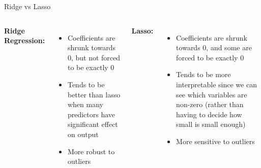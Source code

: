 \documentclass[aspectratio=169,usenames,dvipsnames]{beamer}
\newcommand{\InstructorList}[1]{
\begin{itemize}
	\color{orange}
	#1
\end{itemize}
}
\begin{document}
\begin{frame}[t]{Ridge vs Lasso}
\begin{columns}
\centering
\textbf{Ridge Regression:}
\InstructorList{
  \item Coefficients are shrunk towards 0, but not forced to be exactly 0
  \item Tends to be better than lasso when many predictors have significant effect on output 
  \item More robust to outliers
}

\centering
\textbf{Lasso:}
\InstructorList{
  \item Coefficients are shrunk towards 0, and some are forced to be exactly 0
  \item Tends to be more interpretable since we can see which variables are non-zero (rather than having to decide how small is small enough)
  \item More sensitive to outliers
}
\end{columns}
\end{frame}

	
	
	
	
	
\end{document}
